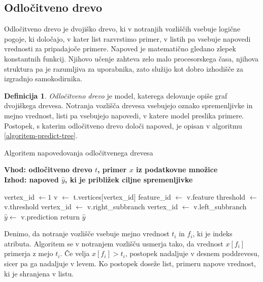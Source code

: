 \documentclass[12pt,a4paper,twoside]{article}
\theoremstyle{definition} %
\newtheorem{definicija}{Definicija}[section]
\theoremstyle{plain} %
\numberwithin{equation}{section}  %
\begin{document}
\subsection{Odločitveno drevo}

Odločitveno drevo je dvojiško drevo, ki v notranjih vozliščih vsebuje logične pogoje, ki določajo, v kater list razvrstimo primer, v listih pa vsebuje napovedi vrednosti za pripadajoče primere.
Napoved je matematično gledano zlepek konstantnih funkcij.
Njihovo učenje zahteva zelo malo procesorskega časa, njihova struktura pa je razumljiva za uporabnika, zato služijo kot dobro izhodišče za izgradnjo samokodirnika.


\begin{definicija} 
\label{def:odlocitveno-drevo}
\emph{Odločitveno drevo} je model, katerega delovanje opiše graf dvojiškega drevesa. 
Notranja vozlišča drevesa vsebujejo oznako spremenljivke in mejno vrednost, listi pa vsebujejo napovedi, v katere model preslika primere. 
Postopek, s katerim odločitveno drevo določi napoved, je opisan v algoritmu \ref{algoritem-predict-tree}.
% 
\begin{algorithm}[ht]
  \caption{Algoritem napovedovanja odločitvenega drevesa}
  \label{algoritem-predict-tree}
  \raggedright
  \textbf{Vhod: odločitveno drevo $t$, primer $x$ iz podatkovne množice}  \\
  \textbf{Izhod: napoved $\hat{y}$, ki je približek ciljne spremenljivke} 
  \begin{algorithmic}[0]
	\State vertex\_id $\gets 1$
		\State v $\gets$ t.vertices[vertex\_id]
		\State feature\_id $\gets$ v.feature
		\State threshold $\gets$ v.threshold
			\State vertex\_id $\gets$ v.right\_subbranch
		\Else
			\State vertex\_id $\gets$ v.left\_subbranch
		\EndIf
	\EndWhile
	\State $\hat{y} \gets$ v.prediction
	\State return $\hat{y}$
  \end{algorithmic}
\end{algorithm}
%
Denimo, da notranje vozlišče vsebuje mejno vrednost $t_i$ in $f_i$, ki je indeks atributa.
Algoritem se v notranjem vozlišču usmerja tako, da vrednost $x[f_i]$ primerja z mejo $t_i$.
Če velja $x[f_i] > t_i$, postopek nadaljuje v desnem poddrevesu, sicer pa ga nadaljuje v levem.
Ko postopek doseže list, primeru napove vrednost, ki je shranjena v listu.
\end{definicija}
\end{document}
